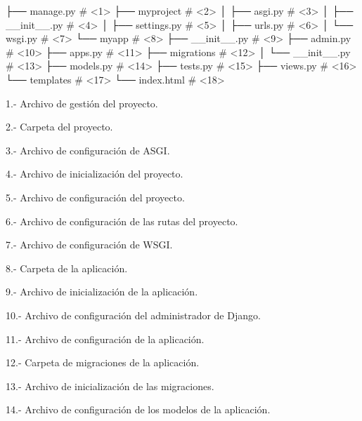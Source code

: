 \documentclass[
  a4paper,
  DIV=11,
  numbers=noendperiod,
  onepage,
  openany]{scrreprt}
\newenvironment{Shaded}{\begin{snugshade}}{\end{snugshade}}
\newcommand{\NormalTok}[1]{\textcolor[rgb]{0.00,0.23,0.31}{#1}}
\begin{document}
\label{annotated-cell-190}%
\begin{Shaded}
\begin{Highlighting}[]
\NormalTok{├── manage.py \# \textless{}1\textgreater{}}
\NormalTok{├── myproject \# \textless{}2\textgreater{}}
\NormalTok{│   ├── asgi.py \# \textless{}3\textgreater{}}
\NormalTok{│   ├── \_\_init\_\_.py \# \textless{}4\textgreater{}}
\NormalTok{│   ├── settings.py \# \textless{}5\textgreater{}}
\NormalTok{│   ├── urls.py \# \textless{}6\textgreater{}}
\NormalTok{│   └── wsgi.py \# \textless{}7\textgreater{}}
\NormalTok{└── myapp \# \textless{}8\textgreater{}}
\NormalTok{    ├── \_\_init\_\_.py \# \textless{}9\textgreater{}}
\NormalTok{    ├── admin.py \# \textless{}10\textgreater{}}
\NormalTok{    ├── apps.py \# \textless{}11\textgreater{}}
\NormalTok{    ├── migrations \# \textless{}12\textgreater{}}
\NormalTok{    │   └── \_\_init\_\_.py \# \textless{}13\textgreater{}}
\NormalTok{    ├── models.py \# \textless{}14\textgreater{}}
\NormalTok{    ├── tests.py \# \textless{}15\textgreater{}}
\NormalTok{    ├── views.py \# \textless{}16\textgreater{}}
\NormalTok{    └── templates \# \textless{}17\textgreater{}}
\NormalTok{        └── index.html \# \textless{}18\textgreater{}}
\end{Highlighting}
\end{Shaded}

1.- Archivo de gestión del proyecto.

2.- Carpeta del proyecto.

3.- Archivo de configuración de ASGI.

4.- Archivo de inicialización del proyecto.

5.- Archivo de configuración del proyecto.

6.- Archivo de configuración de las rutas del proyecto.

7.- Archivo de configuración de WSGI.

8.- Carpeta de la aplicación.

9.- Archivo de inicialización de la aplicación.

10.- Archivo de configuración del administrador de Django.

11.- Archivo de configuración de la aplicación.

12.- Carpeta de migraciones de la aplicación.

13.- Archivo de inicialización de las migraciones.

14.- Archivo de configuración de los modelos de la aplicación.
\end{document}

